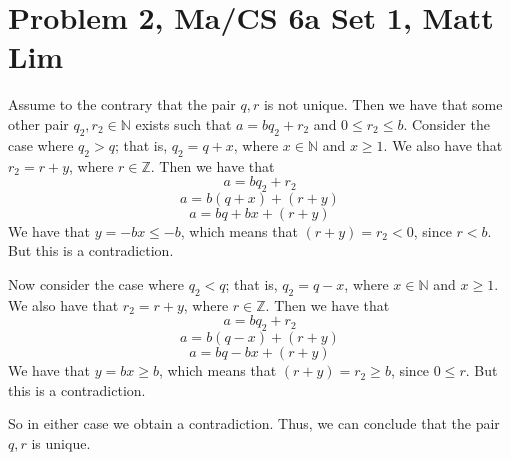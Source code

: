 \documentclass{article}
\begin{document}
\section*{Problem 2, Ma/CS 6a Set 1, Matt Lim}
Assume to the contrary that the pair $q,r$ is not unique. Then we have that
some other pair $q_2, r_2 \in \mathbb{N}$ exists such that $a = bq_2 + r_2$
and $0 \leq r_2 \leq b$. Consider the case where $q_2 > q$; that is, $q_2 = q + x$,
where $x \in \mathbb{N}$ and $x \geq 1$. We also have that $r_2 = r + y$,
where $r \in \mathbb{Z}$. Then we have that
\[ a = bq_2 + r_2 \]
\[ a = b(q + x) + (r + y) \]
\[ a = bq + bx + (r + y) \]
We have that $y = -bx \leq -b$, which means that $(r + y) = r_2 < 0$, since $r < b$.
But this is a contradiction.

Now consider the case where $q_2 < q$; that is, $q_2 = q - x$, where $x \in \mathbb{N}$
and $x \geq 1$. We also have that $r_2 = r + y$, where $r \in \mathbb{Z}$. Then
we have that
\[ a = bq_2 + r_2 \]
\[ a = b(q - x) + (r + y) \]
\[ a = bq - bx + (r + y) \]
We have that $y = bx \geq b$, which means that $(r + y) = r_2 \geq b$, since
$0 \leq r$. But this is a contradiction.

So in either case we obtain a contradiction. Thus, we can conclude that the pair
$q,r$ is unique.
\newpage
\end{document}
